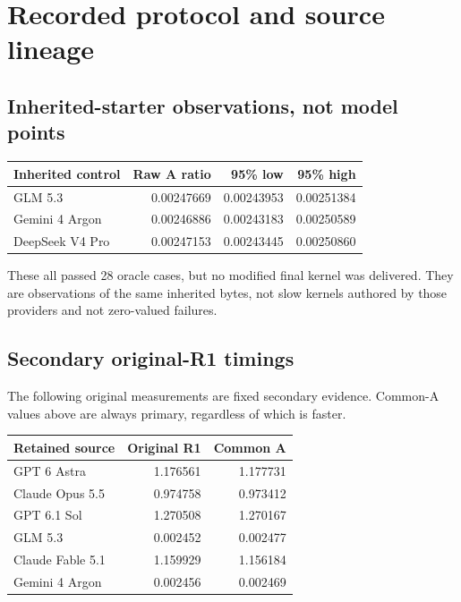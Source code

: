 \documentclass[11pt,letterpaper]{article}
\begin{document}
\appendix\section{Recorded protocol and source lineage}

\subsection{Inherited-starter observations, not model points}

\small\begin{tabularx}{\linewidth}{@{}Xrrr@{}}\toprule\textbf{Inherited control} & \textbf{Raw A ratio} & \textbf{95\% low} & \textbf{95\% high}\\\midrule

GLM 5.3 & 0.00247669 & 0.00243953 & 0.00251384\\

Gemini 4 Argon & 0.00246886 & 0.00243183 & 0.00250589\\

DeepSeek V4 Pro & 0.00247153 & 0.00243445 & 0.00250860\\

\bottomrule\end{tabularx}\normalsize

These all passed 28 oracle cases, but no modified final kernel was delivered. They are observations of the same inherited bytes, not slow kernels authored by those providers and not zero-valued failures.

\subsection{Secondary original-R1 timings}

The following original measurements are fixed secondary evidence. Common-A values above are always primary, regardless of which is faster.

\small\begin{tabularx}{\linewidth}{@{}Xr@{\hspace{12pt}}r@{}}\toprule\textbf{Retained source} & \textbf{Original R1} & \textbf{Common A}\\\midrule

GPT 6 Astra & 1.176561 & 1.177731\\

Claude Opus 5.5 & 0.974758 & 0.973412\\

GPT 6.1 Sol & 1.270508 & 1.270167\\

GLM 5.3 & 0.002452 & 0.002477\\

Claude Fable 5.1 & 1.159929 & 1.156184\\

Gemini 4 Argon & 0.002456 & 0.002469\\

\bottomrule\end{tabularx}\normalsize
\end{document}
